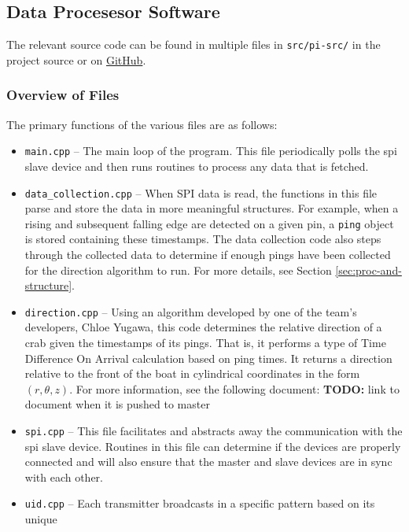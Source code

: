 \documentclass[12pt]{article}
\begin{document}
\subsection{Data Procesesor Software}\label{sec:sw-data-proc}

The relevant source code can be found in multiple files in
\texttt{src/pi-src/} in the project source or on
\href{https://github.com/cabeese/crab-tracker/tree/master/src/pi-src}{GitHub}.

\subsubsection{Overview of Files}

The primary functions of the various files are as follows:
\begin{itemize}
\item \texttt{main.cpp} --
	The main loop of the program. This file periodically polls the
	\gls{spi} slave device and then runs routines to process any data that
	is fetched.
\item \texttt{data\_collection.cpp} --
	When SPI data is read, the functions in this file parse and store the
	data in more meaningful structures.
	For example, when a rising and subsequent falling edge are detected on a
	given pin, a \texttt{ping} object is stored containing these timestamps.
	The data collection code also steps through the collected data to determine
	if enough pings have been collected for the direction algorithm to run.
	For more details, see Section \ref{sec:proc-and-structure}.
\item \texttt{direction.cpp} --
	Using an algorithm developed by one of the team's developers, Chloe Yugawa,
	this code determines the relative direction of a crab given the timestamps
	of its pings.
	That is, it performs a type of Time Difference On Arrival calculation
	based on ping times.
	It returns a direction relative to the front of the boat in cylindrical
	coordinates in the form $(r, \theta, z)$.
	For more information, see the following document:
	{\bf TODO:} link to document when it is pushed to master
\item \texttt{spi.cpp} --
	This file facilitates and abstracts away the communication with the
	\gls{spi} slave device.
	Routines in this file can determine if the devices are properly connected
	and will also ensure that the master and slave devices are in
	sync with each other.
\item \texttt{uid.cpp} --
	Each transmitter broadcasts in a specific pattern based on its unique

\end{itemize}
\end{document}
